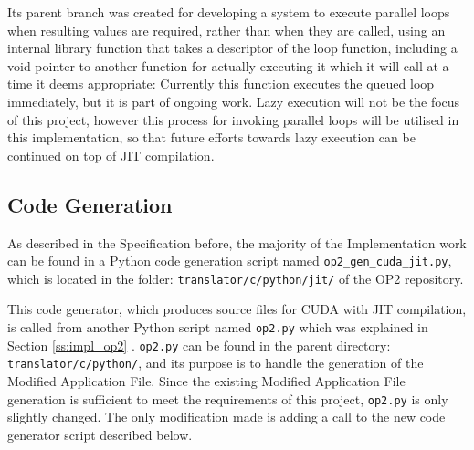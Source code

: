 Its parent branch was created for developing a system to execute parallel loops when resulting values are required, rather than when they are called, using an internal library function that takes a descriptor of the loop function, including a void pointer to another function for actually executing it which it will call at a time it deems appropriate:
\noindent Currently this function executes the queued loop immediately, but it is part of ongoing work. Lazy execution will not be the focus of this project, however this process for invoking parallel loops will be utilised in this implementation, so that future efforts towards lazy execution can be continued on top of JIT compilation.

\subsection{Code Generation}
\label{ss:codegen}
As described in the Specification before, the majority of the Implementation work can be found in a Python code generation script named \verb|op2_gen_cuda_jit.py|, which is located in the folder: \verb|translator/c/python/jit/| of the OP2 repository.
\par This code generator, which produces source files for CUDA with JIT compilation, is called from another Python script named \verb|op2.py| which was explained in Section \ref{ss:impl_op2} . \verb|op2.py| can be found in the parent directory: \verb|translator/c/python/|, and its purpose is to handle the generation of the Modified Application File. Since the existing Modified Application File generation is sufficient to meet the requirements of this project, \verb|op2.py| is only slightly changed. The only modification made is adding a call to the new code generator script described below.

